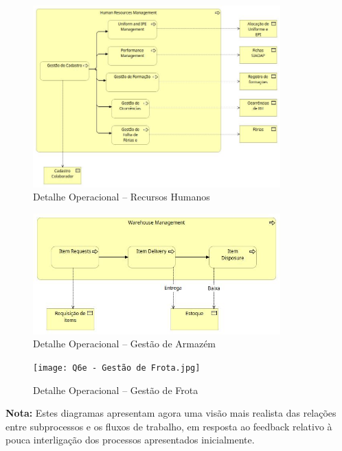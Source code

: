 \documentclass[12pt,a4paper,final]{article}
\begin{document}
    \begin{figure}[H]
        \centering
        \includegraphics[width=0.85\textwidth]{Q6c - Recursos Humanos.jpg}
        \caption{Detalhe Operacional – Recursos Humanos}
        \label{fig:q6-rh}
    \end{figure}

    \begin{figure}[H]
        \centering
        \includegraphics[width=0.85\textwidth]{Q6d - Gestão de Armazém.jpg}
        \caption{Detalhe Operacional – Gestão de Armazém}
        \label{fig:q6-armazem}
    \end{figure}

    \begin{figure}[H]
        \centering
        \texttt{[image: Q6e - Gestão de Frota.jpg]}
        \caption{Detalhe Operacional – Gestão de Frota}
        \label{fig:q6-frota}
    \end{figure}

    \textbf{Nota:} Estes diagramas apresentam agora uma visão mais realista das relações entre subprocessos e os fluxos de trabalho, em resposta ao feedback relativo à pouca interligação dos processos apresentados inicialmente.
\end{document}
